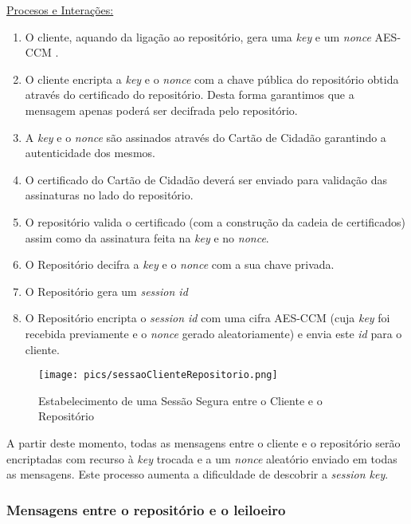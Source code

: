 \documentclass[12pt]{article}
\begin{document}
\vspace{5mm} %
\noindent \underline{Procesos e Interações:}
\begin{enumerate}
    \item O cliente, aquando da ligação ao repositório, gera uma \textit{key} e um  \textit{nonce} AES-CCM .
    \item O cliente encripta a \textit{key} e o \textit{nonce} com a chave pública do repositório obtida através do certificado do repositório. Desta forma garantimos que a mensagem apenas poderá ser decifrada pelo repositório.
    \item A \textit{key} e o \textit{nonce} são assinados através do Cartão de Cidadão garantindo a autenticidade dos mesmos.
    \item O certificado do Cartão de Cidadão deverá ser enviado para validação das assinaturas no lado do repositório.
    \item O repositório valida o certificado (com a construção da cadeia de certificados) assim como da assinatura feita na \textit{key} e no \textit{nonce}.
    \item O Repositório decifra a \textit{key} e o \textit{nonce}  com a sua chave privada.
    \item O Repositório gera um \textit{session id}
    \item O Repositório encripta o \textit{session id} com uma cifra AES-CCM (cuja \textit{key} foi recebida previamente e o \textit{nonce} gerado aleatoriamente) e envia este \textit{id} para o cliente.
\end{enumerate}

\begin{figure}[h!]
    \centering
    \texttt{[image: pics/sessaoClienteRepositorio.png]}
    \caption{Estabelecimento de uma Sessão Segura entre o Cliente e o Repositório}
\end{figure}




\vspace{5mm} %

A partir deste momento, todas as mensagens entre o cliente e o repositório serão encriptadas com recurso à \textit{key} trocada e a um \textit{nonce} aleatório enviado em todas as mensagens. Este processo aumenta a dificuldade de descobrir a  \textit{session key}.

\subsubsection{Mensagens entre o repositório e o leiloeiro}
\end{document}
